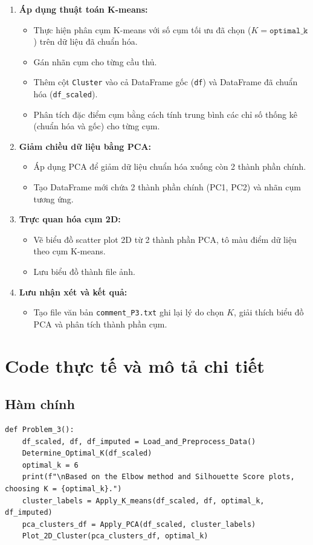\documentclass[12pt]{report}
\begin{document}
{\begin{enumerate}
	\item \textbf{Áp dụng thuật toán K-means:}
\begin{itemize}
  \item Thực hiện phân cụm K-means với số cụm tối ưu đã chọn ($K = \texttt{optimal\_k}$) trên dữ liệu đã chuẩn hóa.
  \item Gán nhãn cụm cho từng cầu thủ.
  \item Thêm cột \texttt{Cluster} vào cả DataFrame gốc (\texttt{df}) và DataFrame đã chuẩn hóa (\texttt{df\_scaled}).
  \item Phân tích đặc điểm cụm bằng cách tính trung bình các chỉ số thống kê (chuẩn hóa và gốc) cho từng cụm.
\end{itemize}

	\item \textbf{Giảm chiều dữ liệu bằng PCA:}
\begin{itemize}
  \item Áp dụng PCA để giảm dữ liệu chuẩn hóa xuống còn 2 thành phần chính.
  \item Tạo DataFrame mới chứa 2 thành phần chính (PC1, PC2) và nhãn cụm tương ứng.
\end{itemize}

	\item \textbf{Trực quan hóa cụm 2D:}
\begin{itemize}
  \item Vẽ biểu đồ scatter plot 2D từ 2 thành phần PCA, tô màu điểm dữ liệu theo cụm K-means.
  \item Lưu biểu đồ thành file ảnh.
\end{itemize}
	\item \textbf{Lưu nhận xét và kết quả:}
\begin{itemize}
  \item Tạo file văn bản \texttt{comment\_P3.txt} ghi lại lý do chọn $K$, giải thích biểu đồ PCA và phân tích thành phần cụm.
\end{itemize}
\end{enumerate}
\section{Code thực tế và mô tả chi tiết}
\subsection{Hàm chính}
\begin{lstlisting}
def Problem_3():
    df_scaled, df, df_imputed = Load_and_Preprocess_Data()
    Determine_Optimal_K(df_scaled)
    optimal_k = 6
    print(f"\nBased on the Elbow method and Silhouette Score plots, choosing K = {optimal_k}.")
    cluster_labels = Apply_K_means(df_scaled, df, optimal_k, df_imputed)
    pca_clusters_df = Apply_PCA(df_scaled, cluster_labels)
    Plot_2D_Cluster(pca_clusters_df, optimal_k)


\end{lstlisting}}
\end{document}
